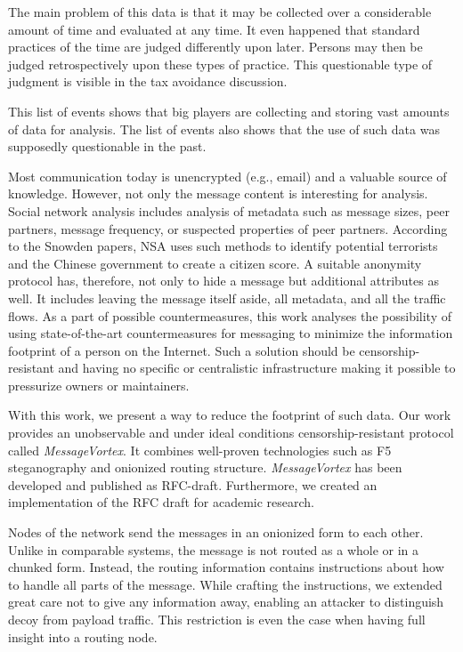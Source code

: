 \documentclass[acmsmall, screen, final]{acmart}
\begin{document}
	The main problem of this data is that it may be collected over a considerable amount of time and evaluated at any time. It even happened that standard practices of the time are judged differently upon later. Persons may then be judged retrospectively upon these types of practice. This questionable type of judgment is visible in the tax avoidance discussion\cite{Amat1999}. 
	
	This list of events shows that big players are collecting and storing vast amounts of data for analysis. The list of events also shows that the use of such data was supposedly questionable in the past. 
	
	Most communication today is unencrypted (e.g., email) and a valuable source of knowledge. However, not only the message content is interesting for analysis. Social network analysis includes analysis of metadata such as message sizes, peer partners, message frequency, or suspected properties of peer partners. According to the Snowden papers\cite{Ackerman2013}, NSA uses such methods to identify potential terrorists and the Chinese government to create a citizen score\cite{socialCreditSystem}. A suitable anonymity protocol has, therefore, not only to hide a message but additional attributes as well. It includes leaving the message itself aside, all metadata, and all the traffic flows. As a part of possible countermeasures, this work analyses the possibility of using state-of-the-art countermeasures for messaging to minimize the information footprint of a person on the Internet. Such a solution should be censorship-resistant and having no specific or centralistic infrastructure making it possible to pressurize owners or maintainers. 
	
	With this work, we present a way to reduce the footprint of such data. Our work provides an unobservable and under ideal conditions censorship-resistant protocol called \emph{MessageVortex}. It combines well-proven technologies such as F5 steganography and onionized routing structure. \emph{MessageVortex} has been developed and published as RFC-draft\cite{MessageVortexRFC}. Furthermore, we created an implementation of the RFC draft for academic research. 
	
	Nodes of the network send the messages in an onionized form to each other. Unlike in comparable systems, the message is not routed as a whole or in a chunked form. Instead, the routing information contains instructions about how to handle all parts of the message. While crafting the instructions, we extended great care not to give any information away, enabling an attacker to distinguish decoy from payload traffic. This restriction is even the case when having full insight into a routing node.
	
\end{document}
